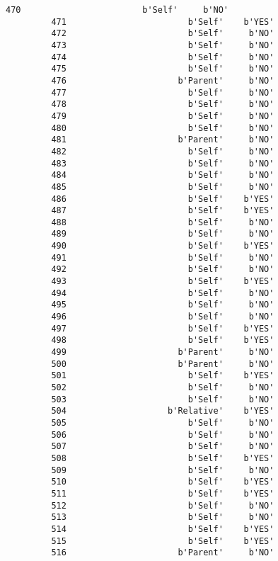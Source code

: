 \documentclass[11pt]{article}
\begin{document}
\begin{Verbatim}[commandchars=\\\{\}]
         470                        b'Self'     b'NO'  
         471                        b'Self'    b'YES'  
         472                        b'Self'     b'NO'  
         473                        b'Self'     b'NO'  
         474                        b'Self'     b'NO'  
         475                        b'Self'     b'NO'  
         476                      b'Parent'     b'NO'  
         477                        b'Self'     b'NO'  
         478                        b'Self'     b'NO'  
         479                        b'Self'     b'NO'  
         480                        b'Self'     b'NO'  
         481                      b'Parent'     b'NO'  
         482                        b'Self'     b'NO'  
         483                        b'Self'     b'NO'  
         484                        b'Self'     b'NO'  
         485                        b'Self'     b'NO'  
         486                        b'Self'    b'YES'  
         487                        b'Self'    b'YES'  
         488                        b'Self'     b'NO'  
         489                        b'Self'     b'NO'  
         490                        b'Self'    b'YES'  
         491                        b'Self'     b'NO'  
         492                        b'Self'     b'NO'  
         493                        b'Self'    b'YES'  
         494                        b'Self'     b'NO'  
         495                        b'Self'     b'NO'  
         496                        b'Self'     b'NO'  
         497                        b'Self'    b'YES'  
         498                        b'Self'    b'YES'  
         499                      b'Parent'     b'NO'  
         500                      b'Parent'     b'NO'  
         501                        b'Self'    b'YES'  
         502                        b'Self'     b'NO'  
         503                        b'Self'     b'NO'  
         504                    b'Relative'    b'YES'  
         505                        b'Self'     b'NO'  
         506                        b'Self'     b'NO'  
         507                        b'Self'     b'NO'  
         508                        b'Self'    b'YES'  
         509                        b'Self'     b'NO'  
         510                        b'Self'    b'YES'  
         511                        b'Self'    b'YES'  
         512                        b'Self'     b'NO'  
         513                        b'Self'     b'NO'  
         514                        b'Self'    b'YES'  
         515                        b'Self'    b'YES'  
         516                      b'Parent'     b'NO'  

\end{Verbatim}
\end{document}
